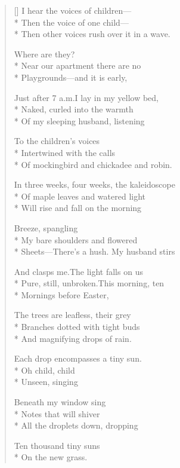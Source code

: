 \label{ch:friday_morning}
\settowidth{\versewidth}{Just after 7 a.m.\qquad I lay in my yellow bed,}
\begin{verse}[\versewidth]
I hear the voices of children---\\*
Then the voice of one child---\\*
Then other voices rush over it in a wave.

Where are they?\\*
Near our apartment there are no\\*
Playgrounds---and it is early,

Just after 7 a.m.\qquad I lay in my yellow bed,\\*
Naked, curled into the warmth\\*
Of my sleeping husband, listening

To the children's voices\\*
Intertwined with the calls\\*
Of mockingbird and chickadee and robin.

In three weeks, four weeks, the kaleidoscope\\*
Of maple leaves and watered light\\*
Will rise and fall on the morning

Breeze, spangling\\*
My bare shoulders and flowered\\*
Sheets---There's a hush.   My husband stirs

And clasps me.\quad The light falls on us\\*
Pure, still, unbroken.\quad This morning, ten\\*
Mornings before Easter,

The trees are leafless, their grey\\*
Branches dotted with tight buds\\*
And magnifying drops of rain.

Each drop encompasses a tiny sun.\\*
Oh child, child\\*
Unseen, singing

Beneath my window sing\\*
Notes that will shiver\\*
All the droplets down, dropping

Ten thousand tiny suns\\*
On the new grass.
\end{verse}
